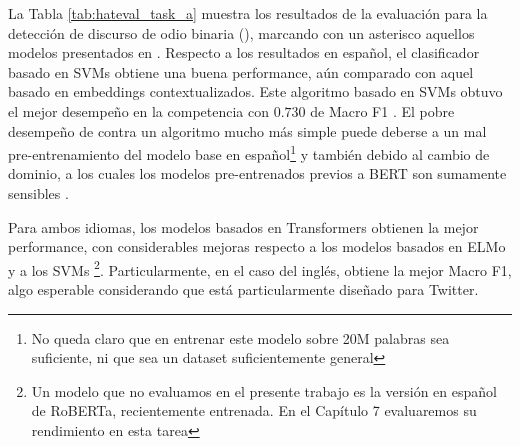 La Tabla \ref{tab:hateval_task_a} muestra los resultados de la evaluación para la detección de discurso de odio binaria (\subtaska{}), marcando con un asterisco aquellos modelos presentados en \citet{perez-2019-atalaya}. Respecto a los resultados en español, el clasificador basado en SVMs obtiene una buena performance, aún comparado con aquel basado en embeddings contextualizados. Este algoritmo basado en SVMs obtuvo el mejor desempeño en la competencia con $0.730$ de Macro F1 \cite{hateval2019semeval}. El pobre desempeño de \elmo{} contra un algoritmo mucho más simple puede deberse a un mal pre-entrenamiento del modelo base en español\footnote{No queda claro que en entrenar este modelo sobre 20M palabras sea suficiente, ni que sea un dataset suficientemente general} y también debido al cambio de dominio, a los cuales los modelos pre-entrenados previos a BERT son sumamente sensibles \cite{hendrycks-etal-2020-pretrained}.

Para ambos idiomas, los modelos basados en Transformers \cite{vaswani2017attention} obtienen la mejor performance, con considerables mejoras respecto a los modelos basados en ELMo y a los SVMs \footnote{Un modelo que no evaluamos en el presente trabajo es la versión en español de RoBERTa, recientemente entrenada. En el Capítulo 7 evaluaremos su rendimiento en esta tarea}. Particularmente, en el caso del inglés, \bertweet{} \cite{dat2020bertweet} obtiene la mejor Macro F1, algo esperable considerando que está particularmente diseñado para Twitter.


